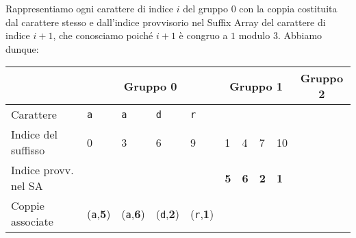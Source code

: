 Rappresentiamo ogni carattere di indice \(i\) del gruppo \(0\) con la coppia 
costituita dal carattere stesso e dall'indice provvisorio nel Suffix Array del 
carattere di indice \(i+1\), che conosciamo poich\'e \(i+1\) \`e congruo a \(1\) modulo \(3\).
Abbiamo dunque:
\begin{table}[H]
  \begin{tabularx}{\linewidth}{l*{11}{X}}
                        & \multicolumn{4}{c}{Gruppo 0 \cellcolor{green} } 
                        & \multicolumn{4}{c}{Gruppo 1 \cellcolor{red} } 
                        & \multicolumn{3}{c}{Gruppo 2 \cellcolor{yellow} }\\
    \hline
    Carattere           & \texttt{a} & \texttt{a} & \texttt{d} & \texttt{r}
                        & \multicolumn{4}{c}{\cellcolor{gray!25}}
                        & \multicolumn{3}{c}{\cellcolor{gray!25}} \\
    Indice del suffisso & 0 & 3 & 6 & 9
                        & 1 & 4 & 7 & 10
                        & \multicolumn{3}{c}{\cellcolor{gray!25}} \\
    Indice provv. nel SA & \multicolumn{4}{c}{\cellcolor{gray!25}}
                        & \textbf{5} & \textbf{6} & \textbf{2} & \textbf{1}
                        & \multicolumn{3}{c}{\cellcolor{gray!25}} \\
    Coppie associate    & (\texttt{a},\textbf{5}) & (\texttt{a},\textbf{6})
                        & (\texttt{d},\textbf{2}) & (\texttt{r},\textbf{1})
                        & \multicolumn{4}{c}{\cellcolor{gray!25}}
                        & \multicolumn{3}{c}{\cellcolor{gray!25}} \\

  \end{tabularx}
\end{table}

